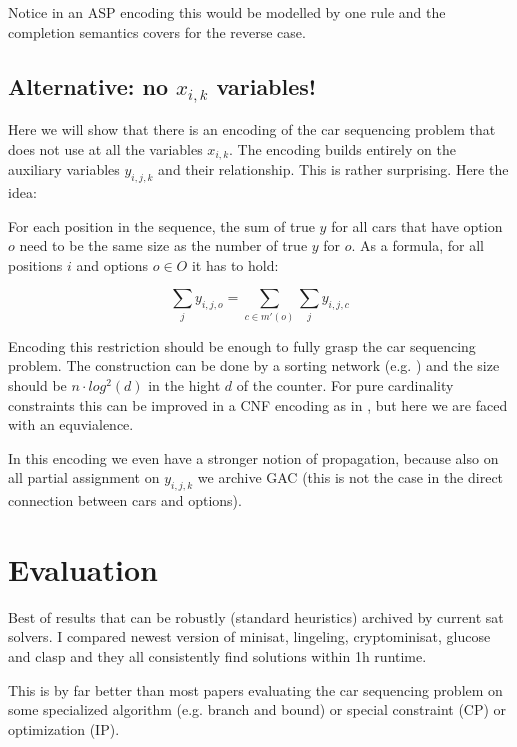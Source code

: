 \documentclass[]{llncs}
\begin{document}
Notice in an ASP encoding this would be modelled by one rule and the
completion semantics covers for the reverse case. 

\subsection{Alternative: no $x_{i,k}$ variables!}

Here we will show that there is an encoding of the car sequencing
problem that does not use at all the variables $x_{i,k}$. The encoding
builds entirely on the auxiliary variables $y_{i,j,k}$ and their
relationship. This is rather surprising. Here the idea: 

For each position in the sequence, the
sum of true $y$ for all cars that have option $o$ need to be the same
size as the number of true $y$ for $o$. As a formula, for all positions
$i$ and options $ o \in O$ it has to hold: 

$$ \sum_{j} y_{i,j,o} = \sum_{c \in m'(o)} \sum_j y_{i,j,c} $$

Encoding this restriction should be enough to fully grasp the car
sequencing problem. The construction can be done by a sorting network
(e.g. \cite{Batcher68} ) and the size should be $n\cdot log^2 (d) $ in the
hight $d$ of the counter. For pure cardinality constraints this can be
improved in a CNF encoding as in \cite{Asin11}, but here we are faced
with an equvialence. 

In this encoding we  even have a stronger notion of propagation, because
also on all partial assignment on $y_{i,j,k}$ we archive GAC (this is not
the case in the direct connection between cars and options). 

\section{Evaluation}

Best of results that can be robustly (standard heuristics) archived by
current sat solvers. I compared newest version of minisat, lingeling,
cryptominisat, glucose and clasp and they all consistently find
solutions within 1h runtime. 

\DTLsetseparator{,}

\begin{table}[htbp]
    \caption{}
    \centering
\end{table}


This is by far better than most papers evaluating the car sequencing
problem on some specialized algorithm (e.g. branch and bound) or special
constraint (CP) or optimization (IP). 
\end{document}
